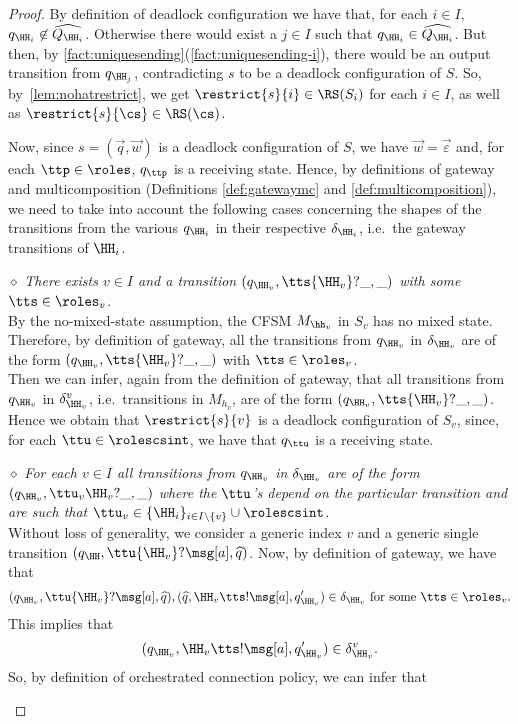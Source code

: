 \begin{proof}
By definition of deadlock configuration we have that, for each $i\in I$,
$q_{\HH_i}\not\in\widehat{Q_{\HH_i}}$.
Otherwise there would exist a $j \in I$ such that $q_{\HH_i}\in\widehat{Q_{\HH_i}}$.
But then, by  \cref{fact:uniquesending}(\ref{fact:uniquesending-i}), 
there would be an output transition from $q_{\HH_j}$, contradicting $s$ to be a deadlock configuration of $S$.
So, by~\cref{lem:nohatrestrict}, we get $\restrict{s}{i}\in \RS(S_i)$ for each $i\in I$, as well as $\restrict{s}{\cs}\in \RS(\cs)$.

Now, since $s= (\vec{q},\vec{w})$ is a deadlock configuration of $S$, we have $\vec{w}=\vec{\varepsilon}$ and, for each $\ttp\in\roles$, $q_\ttp$  is a receiving state.
Hence, by definitions of  gateway and multicomposition 
(Definitions \ref{def:gatewaymc} and \ref{def:multicomposition}),
we need  to 
take into account the following cases concerning the shapes of the transitions from  the various $q_{\HH_i}$  in their respective $\delta_{\HH_i}$, i.e.\ the gateway transitions of $\HH_i$. 

\begin{description}  
  \item
\underline{$\diamond$} 
{\em  There exists $v\in I$ and a transition $(q_{\HH_v},\tts{\HH_v}?\_,\_)$ with  some $\tts \in \roles_v$.}\\
 By the no-mixed-state assumption,
the CFSM $M_{\hh_v}$ in $S_v$ has no mixed state.
Therefore, by definition of gateway, all the transitions from $q_{\HH_v}$ in $\delta_{\HH_v}$ 
are of the form  $(q_{\HH_v},\tts{\HH_v}?\_,\_)$ with $\tts \in \roles_v$.\\ %
Then we can infer, again from the definition of gateway, that all transitions from $q_{\HH_v}$
 in $\delta^v_{\HH_v}$, i.e.\ transitions in  $M_{h_v}$, are of the form $(q_{\HH_v},\tts{\HH_v}?\_,\_)$.
  Hence we obtain that $\restrict{s}{v}$ is a deadlock configuration of $S_v$,
 since, for each $\ttu\in\rolescsint$, we have that $q_{\ttu}$ is a receiving state. 
  

\item
\underline{$\diamond$}
{\em  For each $v\in I$  all transitions from $q_{\HH_v}$ in $\delta_{\HH_v}$
are of the form  $(q_{\HH_v},\ttu_v\HH_v?\_,\_)$
where the $\ttu$'s depend on the particular transition and are such that
 $\ttu_v \in \{\HH_i\}_{i \in I\setminus{\{v\}}}\cup\rolescsint$.}\\
Without loss of generality, we consider a 
generic index $v$ and a generic single transition $(q_{\HH},\ttu{\HH_v}?\msg[a],\widehat{q})$.
Now, by definition of gateway, we have that
$$(q_{\HH_v},\ttu{\HH_v}?\msg[a],\widehat{q}),(\widehat{q},\HH_v{\tts}!\msg[a],q'_{\HH_v})\in \delta_{\HH_v} \text{ for some } \tts\in\roles_v.$$
This implies that
$$(q_{\HH_v},\HH_v{\tts}!\msg[a],q'_{\HH_v})\in \delta^v_{\HH_v}.$$
So, by definition of orchestrated connection policy, we can infer that 


\end{description}
\end{proof}
